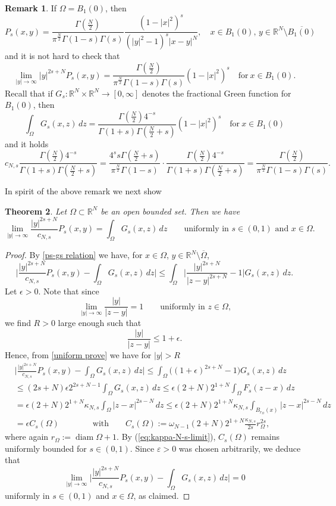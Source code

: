 \documentclass[notitlepage,11pt,reqno]{amsart}
\newtheorem{theorem}{Theorem}[section]
\theoremstyle{definition}
\newtheorem{remark}[theorem]{Remark}
\numberwithin{equation}{section}
\newcommand{\eps}{{\varepsilon}}
\newcommand{\RR}{\mathds{R}}
\DeclareMathOperator*{\diam}{diam}
\begin{document}
\begin{remark}
If $\Omega=B_1(0)$, then 
$$
P_s(x,y)=\frac{\Gamma(\frac{N}{2})}{\pi^{\frac{N}{2}}\Gamma(1-s)\Gamma(s)}\frac{(1-|x|^2)^s}{(|y|^2-1)^s|x-y|^N},\quad x\in B_1(0),\, y\in \RR^N\setminus \overline{B_1(0)}
$$
and it is not hard to check that
$$
\lim_{|y|\to\infty} |y|^{2s+N}P_s(x,y)=\frac{\Gamma(\frac{N}{2})}{\pi^{\frac{N}{2}}\Gamma(1-s)\Gamma(s)}(1-|x|^2)^s\quad \text{for}\ x\in B_1(0).
$$
Recall that if $G_s:\RR^N\times \RR^N\to[0,\infty]$ denotes the fractional Green function for $B_1(0)$, then
$$
\int_{\Omega}G_s(x,z)\, dz=\frac{\Gamma(\frac{N}{2})4^{-s}}{\Gamma(1+s)\Gamma(\frac{N}{2}+s)}(1-|x|^2)^s\quad \text{for}\ x\in B_1(0)
$$
and it holds
$$
c_{N,s}\frac{\Gamma(\frac{N}{2})4^{-s}}{\Gamma(1+s)\Gamma(\frac{N}{2}+s)}=\frac{4^ss\Gamma(\frac{N}{2}+s)}{\pi^{\frac{N}{2}}\Gamma(1-s)}\cdot\frac{\Gamma(\frac{N}{2})4^{-s}}{\Gamma(1+s)\Gamma(\frac{N}{2}+s)}=\frac{\Gamma(\frac{N}{2})}{\pi^{\frac{N}{2}}\Gamma(1-s)\Gamma(s)}.
$$
\end{remark}

In spirit of the above remark we next show
\begin{theorem}\label{a limit}
Let $\Omega\subset \RR^N$ be an open bounded set. Then we have
$$
\lim_{|y|\to \infty}\frac{|y|^{2s+N}}{c_{N,s}}P_s(x,y)=\int_{\Omega}G_s(x,z)\, dz \qquad \text{uniformly in $s\in(0,1)$ and $x\in \Omega$.} 
$$
\end{theorem}
\begin{proof}
By \eqref{ps-gs relation} we have, for $x\in \Omega$, $y\in \RR^N\setminus \overline{\Omega}$,
\begin{equation}\label{uniform prove}
\Bigg|\frac{|y|^{2s+N}}{c_{N,s}}P_s(x,y)-\int_{\Omega}G_s(x,z)\, dz\Bigg| \le \int_{\Omega}\Big|\frac{|y| ^{2s+N}}{|z-y|^{2s+N}}-1\Big| G_s(x,z)\, dz.
\end{equation}
Let $\epsilon>0$. Note that since
$$
\lim_{|y|\to\infty} \frac{|y|}{|z-y|}=1 \qquad \text{uniformly in $z \in \Omega$,}
$$
we find $R>0$ large enough such that  
$$
\frac{|y|}{|z-y|}\leq 1+\epsilon.
$$
Hence, from \eqref{uniform prove} we have for $|y|>R$
\begin{align*}
&\Bigg|\frac{|y|^{2s+N}}{c_{N,s}}P_s(x,y)-\int_{\Omega}G_s(x,z)\, dz\Bigg| \leq \int_{\Omega} \Big( (1+\epsilon)^{2s+N}-1\Big)G_s(x,z)\, dz\\
  &\leq (2s+N)\epsilon 2^{2s+N-1}\int_{\Omega} G_s(x,z)\, dz \leq \epsilon(2+N) 2^{1+N}\int_{\Omega} F_s(z-x)\, dz\\
  &= \epsilon(2+N) 2^{1+N}\kappa_{N,s}\int_{\Omega}|z-x|^{2s-N}\, dz \le \epsilon(2+N) 2^{1+N}\kappa_{N,s}\int_{B_{r_\Omega}(x)}|z-x|^{2s-N}\, dz \\
  &= \epsilon C_s(\Omega) \qquad \qquad \text{with}\qquad C_s(\Omega):= \omega_{N-1}(2+N) 2^{1+N}\frac{\kappa_{N,s}}{2s}r_\Omega^{2s}, 
\end{align*}
where again $r_\Omega:= \diam \Omega +1$. By (\ref{eq:kappa-N-s-limit}), $C_s(\Omega)$ remains uniformly bounded for $s  \in (0,1)$.
Since $\eps>0$ was chosen arbitrarily, we deduce that 
$$
\lim_{|y|\to\infty} \Bigg|\frac{|y|^{2s+N}}{c_{N,s}}P_s(x,y)-\int_{\Omega}G_s(x,z)\, dz\Bigg|=0
$$
uniformly in $s\in(0,1)$ and $x\in \Omega$, as claimed.
\end{proof}
\end{document}
